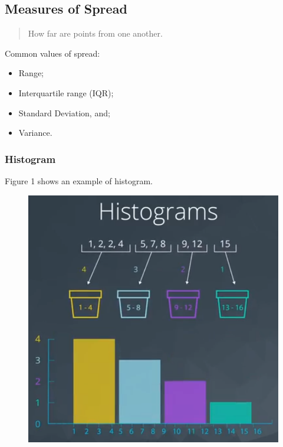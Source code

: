 \documentclass[]{book}
\providecommand{\tightlist}{%
  \setlength{\itemsep}{0pt}\setlength{\parskip}{0pt}}
\begin{document}
\subsection{Measures of Spread}\label{measures-of-spread}

\begin{quote}
How far are points from one another.
\end{quote}

Common values of spread:

\begin{itemize}
\tightlist
\item
  Range;
\item
  Interquartile range (IQR);
\item
  Standard Deviation, and;
\item
  Variance.
\end{itemize}

\subsubsection{Histogram}\label{histogram}

Figure 1 shows an example of histogram.

\begin{figure}
\centering
\includegraphics{01-img/c4_l2_01.png}
\caption{}
\end{figure}
\end{document}

